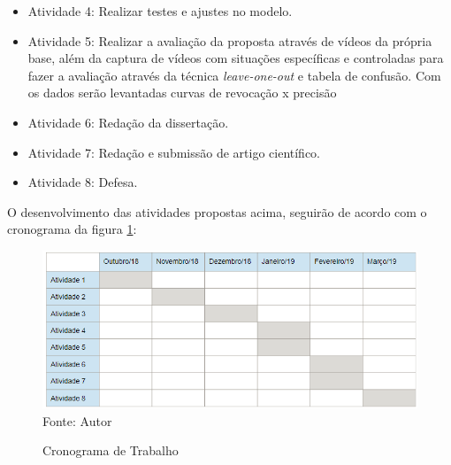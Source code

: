 \documentclass[
	12pt,				%
    oneside,			%
	a4paper,			%
	english,			%
	french,				%
	spanish,			%
	brazil,				%
	]{abntex2}
\begin{document}
\begin{itemize}
 \item Atividade 4: Realizar testes e ajustes no modelo.

 \item Atividade 5: Realizar a avaliação da proposta através de vídeos da própria base, além da captura de vídeos com situações específicas e controladas para fazer a avaliação através da técnica \textit{leave-one-out} e tabela de confusão. Com os dados serão levantadas curvas de revocação x precisão

 \item Atividade 6: Redação da dissertação.
 
  \item Atividade 7: Redação e submissão de artigo científico.

 \item Atividade 8: Defesa.

\end{itemize}

O desenvolvimento das atividades propostas acima, seguirão de acordo com o cronograma da figura \ref{fig:cronograma}:



\begin{figure}[H]
    \centering
    \caption{Cronograma de Trabalho}
    \includegraphics[width=\textwidth]{cronograma_qualificacao1}\\
    Fonte: Autor\hfill
    \label{fig:cronograma}
\end{figure} 







\postextual
\end{document}

